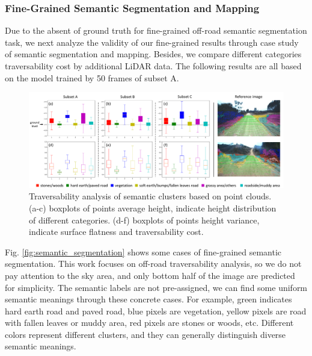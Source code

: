 \documentclass[letterpaper, 10 pt, conference]{ieeeconf}  %
\begin{document}
\subsubsection{Fine-Grained Semantic Segmentation and Mapping}

Due to the absent of ground truth for fine-grained off-road semantic segmentation task, we next analyze the validity of our fine-grained results through case study of semantic segmentation and mapping. Besides, we compare different categories traversability cost by additional LiDAR data. The following results are all based on the model trained by 50 frames of subset A.

\begin{figure}[]
	\centering
	\includegraphics[width=\textwidth]{lidar_analysis.pdf}
	\caption{Traversability analysis of semantic clusters based on point clouds. (a-c) boxplots of points average height, indicate height distribution of different categories. (d-f) boxplots of points height variance, indicate surface flatness and traversability cost. }
	\label{fig:lidar_analysis}
\end{figure}

Fig. \ref{fig:semantic_segmentation} shows some cases of fine-grained semantic segmentation. This work focuses on off-road traversability analysis, so we do not pay attention to the sky area, and only bottom half of the image are predicted for simplicity. The semantic labels are not pre-assigned, we can find some uniform semantic meanings through these concrete cases. For example, green indicates hard earth road and paved road, blue pixels are vegetation, yellow pixels are road with fallen leaves or muddy area, red pixels are stones or woods, etc. Different colors represent different clusters, and they can generally distinguish diverse semantic meanings.
\end{document}
